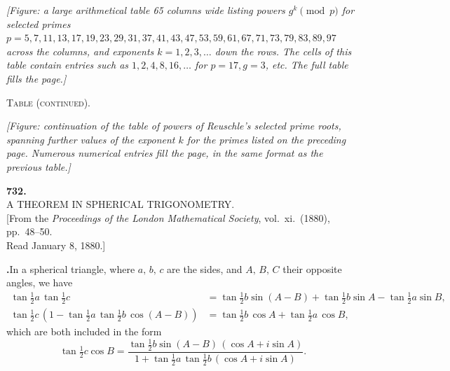 \documentclass[11pt]{article}
\newcommand{\artno}[1]{\textbf{#1.}\quad}
\begin{document}
\medskip

\noindent
\textit{[Figure: a large arithmetical table 65 columns wide listing powers $g^k \pmod p$ for selected primes $p = 5, 7, 11, 13, 17, 19, 23, 29, 31, 37, 41, 43, 47, 53, 59, 61, 67, 71, 73, 79, 83, 89, 97$ across the columns, and exponents $k = 1, 2, 3, \ldots$ down the rows. The cells of this table contain entries such as $1,2,4,8,16, \ldots$ for $p = 17, g = 3$, etc. The full table fills the page.]}

\newpage

\begin{center}
\textsc{Table (continued).}
\end{center}

\medskip

\noindent
\textit{[Figure: continuation of the table of powers of Reuschle's selected prime roots, spanning further values of the exponent $k$ for the primes listed on the preceding page. Numerous numerical entries fill the page, in the same format as the previous table.]}

\newpage

\begin{center}
\textbf{732.}\\[4pt]
\textsc{A THEOREM IN SPHERICAL TRIGONOMETRY.}\\[6pt]
\small[From the \textit{Proceedings of the London Mathematical Society}, vol.~xi.\ (1880), pp.~48--50.\\
Read January 8, 1880.]
\end{center}

\bigskip

\noindent
\artno{}In a spherical triangle, where $a,\,b,\,c$ are the sides, and $A,\,B,\,C$ their opposite
angles, we have
\begin{align*}
\tan\tfrac{1}{2}a\,\tan\tfrac{1}{2}c &= \tan\tfrac{1}{2}b\sin(A - B) + \tan\tfrac{1}{2}b\sin A - \tan\tfrac{1}{2}a\sin B,\\
\tan\tfrac{1}{2}c\,(1 - \tan\tfrac{1}{2}a\,\tan\tfrac{1}{2}b\,\cos(A - B)) &= \tan\tfrac{1}{2}b\,\cos A + \tan\tfrac{1}{2}a\,\cos B,
\end{align*}
which are both included in the form
\[
\tan\tfrac{1}{2}c\cos B = \frac{\tan\tfrac{1}{2}b\sin(A - B)\,(\cos A + i\sin A)}{1 + \tan\tfrac{1}{2}a\,\tan\tfrac{1}{2}b\,(\cos A + i\sin A)}.
\]
\end{document}
